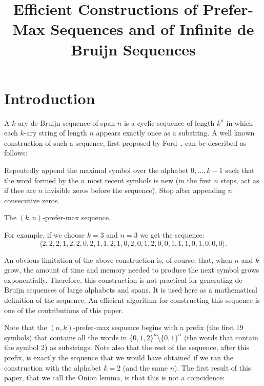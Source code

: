 \documentclass{article}
\title{Efficient Constructions of Prefer-Max Sequences and of Infinite de Bruijn Sequences}
\author{}
\theoremstyle{definition}
\begin{document}
\maketitle

\section{Introduction}

A $k$-ary de Bruijn sequence of span $n$ is a cyclic sequence of length $k^n$ in which each $k$-ary string of length $n$ appears exactly once as
a substring. A well known construction of such a sequence, first proposed by Ford~\cite{Ford1957}, can be described as follows:

\begin{algorithm}
Repeatedly append the maximal symbol over the alphabet $0,\dots,k-1$ such that the word formed by the $n$ most recent symbols is new (in the first $n$ steps, act as if thee are $n$ invisible zeros before the sequence). Stop after appending $n$ consecutive zeros. 
\caption{The $(k,n)$-prefer-max sequence.}
\end{algorithm}


For example, if we choose $k=3$ and $n=3$ we get the sequence:
$$\langle2,2,2,1,2,2,0,2,1,1,2,1,0,2,0,1,2,0,0,1,1,1,0,1,0,0,0\rangle.$$


An obvious limitation of the above construction is, of course, that, when $n$ and $k$ grow, the amount of time and memory needed to produce the next symbol grows exponentially. Therefore, this construction is not practical for generating de Bruijn sequences of large alphabets and spans. It is used here as a mathematical definition of the sequence. An efficient algorithm for constructing this sequence is one of the contributions of this paper.

Note that the $(n,k)$-prefer-max sequence begins with a prefix (the first $19$ symbols) that contains all the words in $\{0,1,2\}^n \setminus \{0,1\}^n$  (the words that contain the symbol $2$) as substrings. Note also that the rest of the sequence, after this prefix, is exactly the sequence that we would have obtained if we ran the construction with the alphabet $k=2$ (and the same $n$). The first result of this paper, that we call the Onion lemma, is that this is not a coincidence:
\end{document}
